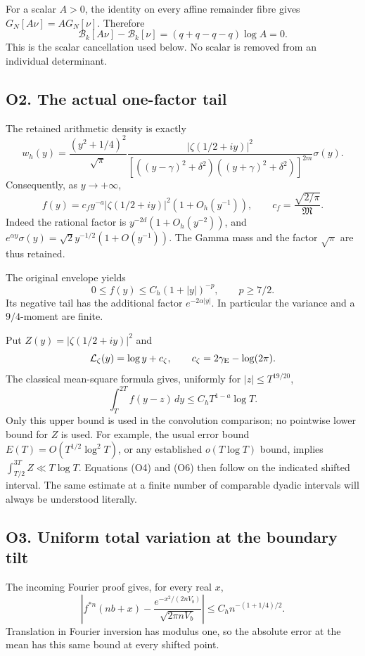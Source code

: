 For a scalar \(A>0\), the identity on every affine remainder fibre gives
\(G_N[A\nu]=A G_N[\nu]\). Therefore \[
\mathcal B_k[A\nu]-\mathcal B_k[\nu]
=(q+q-q-q)\log A=0.\tag{O3}
\] This is the scalar cancellation used below. No scalar is removed from
an individual determinant.

\subsection{O2. The actual one-factor
tail}\label{sa:o2.-the-actual-one-factor-tail}

The retained arithmetic density is exactly \[
w_h(y)=\frac{(y^2+1/4)^2}{\sqrt\pi}
\frac{|\zeta(1/2+iy)|^2}
{[((y-\gamma)^2+\delta^2)((y+\gamma)^2+\delta^2)]^{2m}}
\sigma(y).
\] Consequently, as \(y\to+\infty\), \[
\boxed{f(y)=c_f y^{-a}|\zeta(1/2+iy)|^2(1+O_h(y^{-1})),
\qquad c_f=\frac{\sqrt{2/\pi}}{\mathfrak M}.}\tag{O4}
\] Indeed the rational factor is \(y^{-2d}(1+O_h(y^{-2}))\), and
\(e^{\alpha y}\sigma(y)=\sqrt2 y^{-1/2}(1+O(y^{-1}))\). The Gamma mass
and the factor \(\sqrt\pi\) are thus retained.

The original envelope yields \[
0\le f(y)\le C_h(1+|y|)^{-p},\qquad p\ge7/2.
\tag{O5}
\] Its negative tail has the additional factor \(e^{-2\alpha|y|}\). In
particular the variance and a \(9/4\)-moment are finite.

Put \(Z(y)=|\zeta(1/2+iy)|^2\) and \[
\mathcal L_\zeta(y)=\log y+c_\zeta,\qquad
c_\zeta=2\gamma_{\rm E}-\log(2\pi).
\] The classical mean-square formula gives, uniformly for
\(|z|\le T^{19/20}\), \[
\int_T^{2T}f(y-z)\,dy\le C_h T^{1-a}\log T.\tag{O6}
\] Only this upper bound is used in the convolution comparison; no
pointwise lower bound for \(Z\) is used. For example, the usual error
bound \(E(T)=O(T^{1/2}\log^2T)\), or any established \(o(T\log T)\)
bound, implies \(\int_{T/2}^{3T}Z\ll T\log T\). Equations (O4) and (O6)
then follow on the indicated shifted interval. The same estimate at a
finite number of comparable dyadic intervals will always be understood
literally.

\subsection{O3. Uniform total variation at the boundary
tilt}\label{sa:o3.-uniform-total-variation-at-the-boundary-tilt}

The incoming Fourier proof gives, for every real \(x\), \[
\left|f^{*n}(nb+x)-
\frac{e^{-x^2/(2nV_b)}}{\sqrt{2\pi nV_b}}\right|
\le C_h n^{-(1+1/4)/2}.\tag{O7}
\] Translation in Fourier inversion has modulus one, so the absolute
error at the mean has this same bound at every shifted point.


